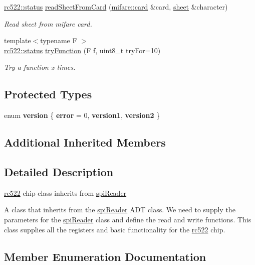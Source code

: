 \begin{DoxyCompactItemize}
\hyperlink{classspiReader_a4bcf984823c38cf4841ebf619e788790}{rc522\+::status} \hyperlink{classrc522_ad265d81264eecf2124ad224c89d6c8e7}{read\+Sheet\+From\+Card} (\hyperlink{classmifare_1_1card}{mifare\+::card} \&card, \hyperlink{classsheet}{sheet} \&character)
\begin{DoxyCompactList}\small\item\em Read sheet from mifare card. \end{DoxyCompactList}\item 
{\footnotesize template$<$typename F $>$ }\\\hyperlink{classspiReader_a4bcf984823c38cf4841ebf619e788790}{rc522\+::status} \hyperlink{classrc522_a8930234e6cc3aa99ae679001d0ea9e86}{try\+Function} (F f, uint8\+\_\+t try\+For=10)
\begin{DoxyCompactList}\small\item\em Try a function x times. \end{DoxyCompactList}\end{DoxyCompactItemize}
\subsection*{Protected Types}
\begin{DoxyCompactItemize}
\item 
\mbox{\label{classrc522_a77e00b5070f1c24350d4ac87566837fd}} 
enum {\bfseries version} \{ {\bfseries error} = 0, 
{\bfseries version1}, 
{\bfseries version2}
 \}
\end{DoxyCompactItemize}
\subsection*{Additional Inherited Members}


\subsection{Detailed Description}
\hyperlink{classrc522}{rc522} chip class inherits from \hyperlink{classspiReader}{spi\+Reader} 

A class that inherits from the \hyperlink{classspiReader}{spi\+Reader} A\+DT class. We need to supply the parameters for the \hyperlink{classspiReader}{spi\+Reader} class and define the read and write functions. This class supplies all the registers and basic functionality for the \hyperlink{classrc522}{rc522} chip. 

\subsection{Member Enumeration Documentation}
\mbox{\label{classrc522_a6df2359c88d6c2f47faf58bc9e09eaa4}} 
